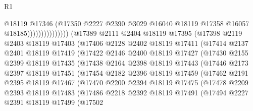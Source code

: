 \begin{lexlean}{R1}
\begin{coremodule}
                                    @18119
                                    @17346
                                    (@17350
                                      @2227
                                      @2390
                                      @3029
                                      @16040
                                      @18119
                                      @17358
                                      @16057
                                      @18185)))))))))))))))
        (@17389
          @2111
          @2404
          @18119
          @17395
          (@17398
            @2119
            @2403
            @18119
            @17403
            (@17406
              @2128
              @2402
              @18119
              @17411
              (@17414
                @2137
                @2401
                @18119
                @17419
                (@17422
                  @2146
                  @2400
                  @18119
                  @17427
                  (@17430
                    @2155
                    @2399
                    @18119
                    @17435
                    (@17438
                      @2164
                      @2398
                      @18119
                      @17443
                      (@17446
                        @2173
                        @2397
                        @18119
                        @17451
                        (@17454
                          @2182
                          @2396
                          @18119
                          @17459
                          (@17462
                            @2191
                            @2395
                            @18119
                            @17467
                            (@17470
                              @2200
                              @2394
                              @18119
                              @17475
                              (@17478
                                @2209
                                @2393
                                @18119
                                @17483
                                (@17486
                                  @2218
                                  @2392
                                  @18119
                                  @17491
                                  (@17494
                                    @2227
                                    @2391
                                    @18119
                                    @17499
                                    (@17502

\end{coremodule}
\end{lexlean}
